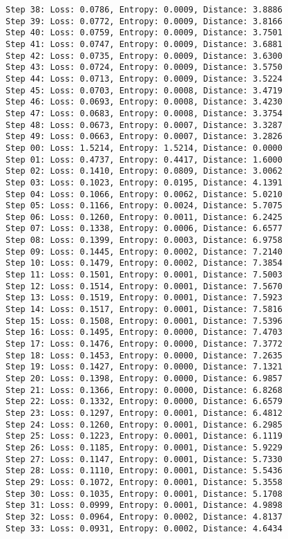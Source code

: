 \documentclass[11pt]{article}
\begin{document}
\begin{Verbatim}[commandchars=\\\{\}]
Step 38: Loss: 0.0786, Entropy: 0.0009, Distance: 3.8886
Step 39: Loss: 0.0772, Entropy: 0.0009, Distance: 3.8166
Step 40: Loss: 0.0759, Entropy: 0.0009, Distance: 3.7501
Step 41: Loss: 0.0747, Entropy: 0.0009, Distance: 3.6881
Step 42: Loss: 0.0735, Entropy: 0.0009, Distance: 3.6300
Step 43: Loss: 0.0724, Entropy: 0.0009, Distance: 3.5750
Step 44: Loss: 0.0713, Entropy: 0.0009, Distance: 3.5224
Step 45: Loss: 0.0703, Entropy: 0.0008, Distance: 3.4719
Step 46: Loss: 0.0693, Entropy: 0.0008, Distance: 3.4230
Step 47: Loss: 0.0683, Entropy: 0.0008, Distance: 3.3754
Step 48: Loss: 0.0673, Entropy: 0.0007, Distance: 3.3287
Step 49: Loss: 0.0663, Entropy: 0.0007, Distance: 3.2826
Step 00: Loss: 1.5214, Entropy: 1.5214, Distance: 0.0000
Step 01: Loss: 0.4737, Entropy: 0.4417, Distance: 1.6000
Step 02: Loss: 0.1410, Entropy: 0.0809, Distance: 3.0062
Step 03: Loss: 0.1023, Entropy: 0.0195, Distance: 4.1391
Step 04: Loss: 0.1066, Entropy: 0.0062, Distance: 5.0210
Step 05: Loss: 0.1166, Entropy: 0.0024, Distance: 5.7075
Step 06: Loss: 0.1260, Entropy: 0.0011, Distance: 6.2425
Step 07: Loss: 0.1338, Entropy: 0.0006, Distance: 6.6577
Step 08: Loss: 0.1399, Entropy: 0.0003, Distance: 6.9758
Step 09: Loss: 0.1445, Entropy: 0.0002, Distance: 7.2140
Step 10: Loss: 0.1479, Entropy: 0.0002, Distance: 7.3854
Step 11: Loss: 0.1501, Entropy: 0.0001, Distance: 7.5003
Step 12: Loss: 0.1514, Entropy: 0.0001, Distance: 7.5670
Step 13: Loss: 0.1519, Entropy: 0.0001, Distance: 7.5923
Step 14: Loss: 0.1517, Entropy: 0.0001, Distance: 7.5816
Step 15: Loss: 0.1508, Entropy: 0.0001, Distance: 7.5396
Step 16: Loss: 0.1495, Entropy: 0.0000, Distance: 7.4703
Step 17: Loss: 0.1476, Entropy: 0.0000, Distance: 7.3772
Step 18: Loss: 0.1453, Entropy: 0.0000, Distance: 7.2635
Step 19: Loss: 0.1427, Entropy: 0.0000, Distance: 7.1321
Step 20: Loss: 0.1398, Entropy: 0.0000, Distance: 6.9857
Step 21: Loss: 0.1366, Entropy: 0.0000, Distance: 6.8268
Step 22: Loss: 0.1332, Entropy: 0.0000, Distance: 6.6579
Step 23: Loss: 0.1297, Entropy: 0.0001, Distance: 6.4812
Step 24: Loss: 0.1260, Entropy: 0.0001, Distance: 6.2985
Step 25: Loss: 0.1223, Entropy: 0.0001, Distance: 6.1119
Step 26: Loss: 0.1185, Entropy: 0.0001, Distance: 5.9229
Step 27: Loss: 0.1147, Entropy: 0.0001, Distance: 5.7330
Step 28: Loss: 0.1110, Entropy: 0.0001, Distance: 5.5436
Step 29: Loss: 0.1072, Entropy: 0.0001, Distance: 5.3558
Step 30: Loss: 0.1035, Entropy: 0.0001, Distance: 5.1708
Step 31: Loss: 0.0999, Entropy: 0.0001, Distance: 4.9898
Step 32: Loss: 0.0964, Entropy: 0.0002, Distance: 4.8137
Step 33: Loss: 0.0931, Entropy: 0.0002, Distance: 4.6434

\end{Verbatim}
\end{document}
